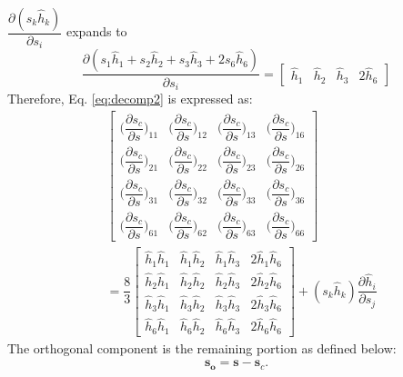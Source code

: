 \documentclass[12pt]{amsart}
\begin{document}
$\dfrac{\partial(s_k\hat{h}_k)}{\partial s_i}$ expands to
\begin{equation}
  \label{eq:dsh_ds}
  \dfrac{\partial(s_1\hat{h}_1+s_2\hat{h}_2+s_3\hat{h}_3+2s_6\hat{h}_6)}{\partial s_i}=
  \begin{bmatrix}
    \hat{h}_1&\hat{h}_2&\hat{h}_3&2\hat{h}_6
  \end{bmatrix}
\end{equation}
Therefore, Eq. \ref{eq:decomp2} is expressed as:
\begin{equation}
  \label{eq:dsc_ds_matrix}
  \begin{split}
    &\begin{bmatrix}
      \bigg( \dfrac{\partial s_c}{\partial s}\bigg)_{11}&\bigg( \dfrac{\partial s_c}{\partial s}\bigg)_{12} &\bigg( \dfrac{\partial s_c}{\partial s}\bigg)_{13}&\bigg( \dfrac{\partial s_c}{\partial s}\bigg)_{16}\\
      \bigg( \dfrac{\partial s_c}{\partial s}\bigg)_{21}&\bigg( \dfrac{\partial s_c}{\partial s}\bigg)_{22} &\bigg( \dfrac{\partial s_c}{\partial s}\bigg)_{23} &\bigg( \dfrac{\partial s_c}{\partial s}\bigg)_{26}\\
      \bigg( \dfrac{\partial s_c}{\partial s}\bigg)_{31}&\bigg( \dfrac{\partial s_c}{\partial s}\bigg)_{32} &\bigg( \dfrac{\partial s_c}{\partial s}\bigg)_{33}&\bigg( \dfrac{\partial s_c}{\partial s}\bigg)_{36}\\
      \bigg( \dfrac{\partial s_c}{\partial s}\bigg)_{61}&\bigg( \dfrac{\partial s_c}{\partial s}\bigg)_{62} &\bigg( \dfrac{\partial s_c}{\partial s}\bigg)_{63}&\bigg( \dfrac{\partial s_c}{\partial s}\bigg)_{66}
    \end{bmatrix}\\
    &=\dfrac{8}{3}
    \begin{bmatrix}
      \hat{h}_1\hat{h}_1&\hat{h}_1\hat{h}_2&\hat{h}_1\hat{h}_3&2\hat{h}_1\hat{h}_6\\
      \hat{h}_2\hat{h}_1&\hat{h}_2\hat{h}_2&\hat{h}_2\hat{h}_3&2\hat{h}_2\hat{h}_6\\
      \hat{h}_3\hat{h}_1&\hat{h}_3\hat{h}_2&\hat{h}_3\hat{h}_3&2\hat{h}_3\hat{h}_6\\
      \hat{h}_6\hat{h}_1&\hat{h}_6\hat{h}_2&\hat{h}_6\hat{h}_3&2\hat{h}_6\hat{h}_6
    \end{bmatrix}
    +(s_k\hat{h}_k)\dfrac{\partial\hat{h}_i}{\partial s_j}
  \end{split}
\end{equation}
The orthogonal component is the remaining portion as defined below:
\begin{eqnarray}
  \label{eq:decomp3}
  \mathbf{s_o} = \mathbf{s} - \mathbf{s}_c.
\end{eqnarray}
\end{document}
